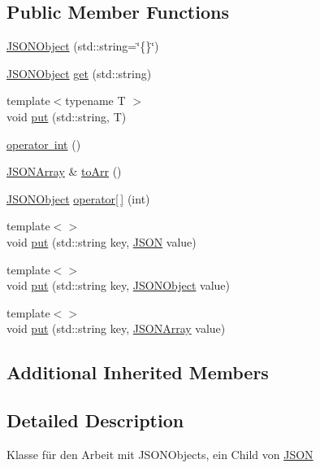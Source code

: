 \subsection*{Public Member Functions}
\begin{DoxyCompactItemize}
\item 
\mbox{\hyperlink{class_j_s_o_n_object_a88fb28a2f166ecc545ae94f170ddd0ab}{J\+S\+O\+N\+Object}} (std\+::string=\char`\"{}\{\}\char`\"{})
\item 
\mbox{\hyperlink{class_j_s_o_n_object}{J\+S\+O\+N\+Object}} \mbox{\hyperlink{class_j_s_o_n_object_ac2dd3ddb61b11a3ad800b09b41ac1562}{get}} (std\+::string)
\item 
{\footnotesize template$<$typename T $>$ }\\void \mbox{\hyperlink{class_j_s_o_n_object_abe961a3b81398975838f4c51a694c81a}{put}} (std\+::string, T)
\item 
\mbox{\hyperlink{class_j_s_o_n_object_a1a866cc075bfb0ca65cb5e93ddb24b0c}{operator int}} ()
\item 
\mbox{\hyperlink{class_j_s_o_n_array}{J\+S\+O\+N\+Array}} \& \mbox{\hyperlink{class_j_s_o_n_object_a00705a3a80423d953af1070da6a4002c}{to\+Arr}} ()
\item 
\mbox{\hyperlink{class_j_s_o_n_object}{J\+S\+O\+N\+Object}} \mbox{\hyperlink{class_j_s_o_n_object_a2aa0258a2d408f348934e470f2c26e94}{operator\mbox{[}$\,$\mbox{]}}} (int)
\item 
{\footnotesize template$<$$>$ }\\void \mbox{\hyperlink{class_j_s_o_n_object_a8d8c154a5eec2113eafca987d372ee98}{put}} (std\+::string key, \mbox{\hyperlink{class_j_s_o_n}{J\+S\+ON}} value)
\item 
{\footnotesize template$<$$>$ }\\void \mbox{\hyperlink{class_j_s_o_n_object_a891e3c2dd856bb8b7bfca0e9994ff846}{put}} (std\+::string key, \mbox{\hyperlink{class_j_s_o_n_object}{J\+S\+O\+N\+Object}} value)
\item 
{\footnotesize template$<$$>$ }\\void \mbox{\hyperlink{class_j_s_o_n_object_afeb8c8e869fed192fb28d19be3b209c0}{put}} (std\+::string key, \mbox{\hyperlink{class_j_s_o_n_array}{J\+S\+O\+N\+Array}} value)
\end{DoxyCompactItemize}
\subsection*{Additional Inherited Members}


\subsection{Detailed Description}
Klasse für den Arbeit mit J\+S\+O\+N\+Objects, ein Child von \mbox{\hyperlink{class_j_s_o_n}{J\+S\+ON}} 

